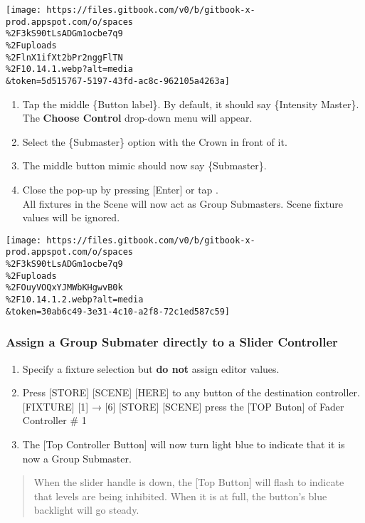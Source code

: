 \documentclass[
]{article}
\begin{document}
\texttt{[image: https://files.gitbook.com/v0/b/gitbook-x-prod.appspot.com/o/spaces\\\%2F3kS90tLsADGm1ocbe7q9\\\%2Fuploads\\\%2FlnX1ifXt2bPr2nggFlTN\\\%2F10.14.1.webp?alt=media\\\&token=5d515767-5197-43fd-ac8c-962105a4263a]}

\hspace{0pt}

\begin{enumerate}
\def\labelenumi{\arabic{enumi}.}
\setcounter{enumi}{2}
\item
  Tap the middle \{Button label\}. By default, it should say \{Intensity Master\}. The \textbf{Choose Control} drop-down menu will appear.
\item
  Select the \{Submaster\} option with the Crown in front of it.
\item
  The middle button mimic should now say \{Submaster\}.
\item
  Close the pop-up by pressing {[}Enter{]} or tap .\\
  All fixtures in the Scene will now act as Group Submasters. Scene fixture values will be ignored.
\end{enumerate}

\texttt{[image: https://files.gitbook.com/v0/b/gitbook-x-prod.appspot.com/o/spaces\\\%2F3kS90tLsADGm1ocbe7q9\\\%2Fuploads\\\%2FOuyVOQxYJMWbKHgwvB0k\\\%2F10.14.1.2.webp?alt=media\\\&token=30ab6c49-3e31-4c10-a2f8-72c1ed587c59]}

\hypertarget{assign-a-group-submater-directly-to-a-slider-controller}{%
\subsubsection{Assign a Group Submater directly to a Slider Controller}\label{assign-a-group-submater-directly-to-a-slider-controller}}

\begin{enumerate}
\def\labelenumi{\arabic{enumi}.}
\item
  Specify a fixture selection but \textbf{do not} assign editor values.
\item
  Press {[}STORE{]} {[}SCENE{]} {[}HERE{]} to any button of the destination controller. {[}FIXTURE{]} {[}1{]} → {[}6{]} {[}STORE{]} {[}SCENE{]} press the {[}TOP Buton{]} of Fader Controller \# 1
\item
  The {[}Top Controller Button{]} will now turn {light blue} to indicate that it is now a Group Submaster.
\end{enumerate}

\begin{quote}
{When the slider handle is down, the {[}Top Button{]} will flash to indicate that levels are being inhibited. When it is at full, the button's blue backlight will go steady.}
\end{quote}
\end{document}
